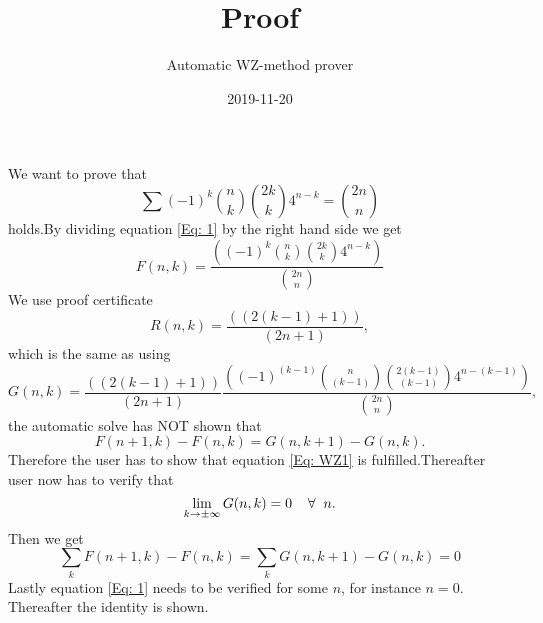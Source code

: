 \documentclass{article}
\title{Proof}
\author{Automatic WZ-method prover}
\date{2019-11-20}
\let\oldforall\forall
\renewcommand{\forall}{\hspace*{2mm}\oldforall\hspace*{1mm}}
\begin{document}
\maketitle
We want to prove that
\begin{equation}\label{Eq: 1}
\sum (-1)^k\binom{n}{k}\binom{2k}{k}4^{n-k}=\binom{2n}{n}
\end{equation}
holds.By dividing equation \ref{Eq: 1} by the right hand side we get
\begin{equation}
F(n,k)=\frac{((-1)^{k}\binom{n}{k}\binom{2k}{k}4^{n-k})}{\binom{2n}{n}}
\end{equation}
We use proof certificate
\begin{equation}
R(n,k)=\frac{((2(k-1)+1))}{(2n+1)},
\end{equation}
which is the same as using
\begin{equation}
G(n,k)=\frac{((2(k-1)+1))}{(2n+1)}\frac{((-1)^{(k-1)}\binom{n}{(k-1)}\binom{2(k-1)}{(k-1)}4^{n-(k-1)})}{\binom{2n}{n}},
\end{equation}
the automatic solve has NOT shown that
\begin{equation}\label{Eq: WZ1}
F(n+1,k)-F(n,k)=G(n,k+1)-G(n,k).
\end{equation}
Therefore the user has to show that equation \ref{Eq: WZ1} is fulfilled.Thereafter user now has to verify that
\begin{equation}
\lim_{k\to\pm\infty}G(n,k)=0\forall n.
\end{equation}
Then we get
\begin{equation}
\sum_k F(n+1,k)-F(n,k)=\sum_k G(n,k+1)-G(n,k)=0\end{equation}Lastly equation \ref{Eq: 1} needs to be verified for some $n$, for instance $n=0$. Thereafter the identity is shown.
\end{document}
